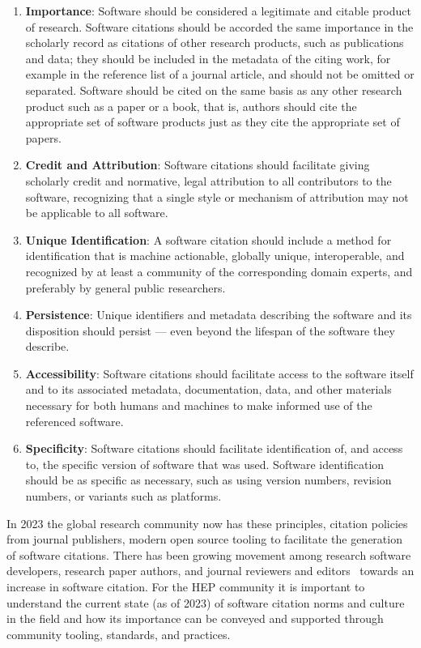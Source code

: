 \begin{enumerate}
    \item \textbf{Importance}: Software should be considered a legitimate and citable product of research.
Software citations should be accorded the same importance in the scholarly record as citations of other research products, such as publications and data; they should be included in the metadata of the citing work, for example in the reference list of a journal article, and should not be omitted or separated.
Software should be cited on the same basis as any other research product such as a paper or a book, that is, authors should cite the appropriate set of software products just as they cite the appropriate set of papers.
    \item \textbf{Credit and Attribution}: Software citations should facilitate giving scholarly credit and normative, legal attribution to all contributors to the software, recognizing that a single style or mechanism of attribution may not be applicable to all software.
    \item \textbf{Unique Identification}: A software citation should include a method for identification that is machine actionable, globally unique, interoperable, and recognized by at least a community of the corresponding domain experts, and preferably by general public researchers.
    \item \textbf{Persistence}: Unique identifiers and metadata describing the software and its disposition should persist --- even beyond the lifespan of the software they describe.
    \item \textbf{Accessibility}: Software citations should facilitate access to the software itself and to its associated metadata, documentation, data, and other materials necessary for both humans and machines to make informed use of the referenced software.
    \item \textbf{Specificity}: Software citations should facilitate identification of, and access to, the specific version of software that was used.
Software identification should be as specific as necessary, such as using version numbers, revision numbers, or variants such as platforms.
\end{enumerate}

In 2023 the global research community now has these principles, citation policies from journal publishers, modern open source tooling to facilitate the generation of software citations.
There has been growing movement among research software developers, research paper authors, and journal reviewers and editors~\cite{smith_journal_2018} towards an increase in software citation.
For the HEP community it is important to understand the current state (as of 2023) of software citation norms and culture in the field and how its importance can be conveyed and supported through community tooling, standards, and practices.

